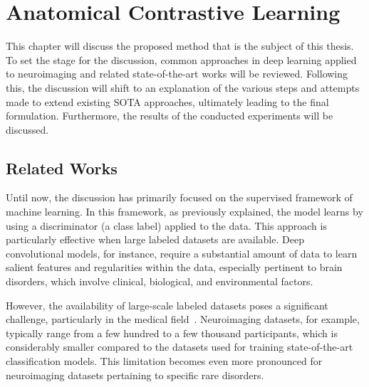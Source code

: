 \chapter{Anatomical Contrastive Learning}

This chapter will discuss the proposed method that is the subject of this
thesis. To set the stage for the discussion, common approaches in deep learning
applied to neuroimaging and related state-of-the-art works will be reviewed.
Following this, the discussion will shift to an explanation of the various steps
and attempts made to extend existing SOTA approaches, ultimately leading to the
final formulation. Furthermore, the results of the conducted experiments will be
discussed.

\section{Related Works}
Until now, the discussion has primarily focused on the supervised framework of
machine learning. In this framework, as previously explained, the model learns
by using a discriminator (a class label) applied to the data. This approach is
particularly effective when large labeled datasets are available. Deep
convolutional models, for instance, require a substantial amount of data to
learn salient features and regularities within the data, especially pertinent to
brain disorders, which involve clinical, biological, and environmental factors.

However, the availability of large-scale labeled datasets poses a significant
challenge, particularly in the medical field~.
Neuroimaging datasets, for example, typically range from a few hundred to a few
thousand participants, which is considerably smaller compared to the datasets
used for training state-of-the-art classification models. This
limitation becomes even more pronounced for neuroimaging datasets pertaining to
specific rare disorders.

